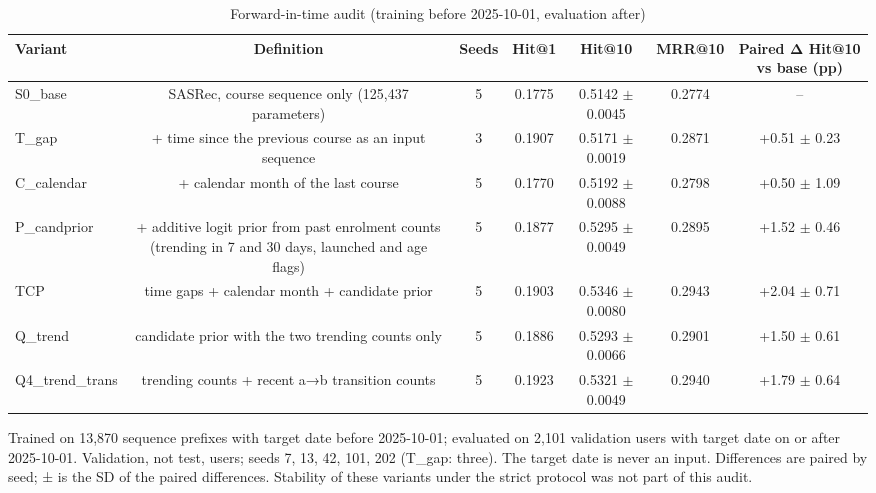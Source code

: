 \begin{table}[t]\centering\footnotesize
\caption{Forward-in-time audit (training before 2025-10-01, evaluation after)}
\begin{tabular}{lcccccc}\toprule
Variant & Definition & Seeds & Hit@1 & Hit@10 & MRR@10 & Paired Δ Hit@10 vs base (pp) \\
\midrule
S0\_base & SASRec, course sequence only (125,437 parameters) & 5 & 0.1775 & 0.5142 $\pm$ 0.0045 & 0.2774 & – \\
T\_gap & + time since the previous course as an input sequence & 3 & 0.1907 & 0.5171 $\pm$ 0.0019 & 0.2871 & +0.51 $\pm$ 0.23 \\
C\_calendar & + calendar month of the last course & 5 & 0.1770 & 0.5192 $\pm$ 0.0088 & 0.2798 & +0.50 $\pm$ 1.09 \\
P\_candprior & + additive logit prior from past enrolment counts (trending in 7 and 30 days, launched and age flags) & 5 & 0.1877 & 0.5295 $\pm$ 0.0049 & 0.2895 & +1.52 $\pm$ 0.46 \\
TCP & time gaps + calendar month + candidate prior & 5 & 0.1903 & 0.5346 $\pm$ 0.0080 & 0.2943 & +2.04 $\pm$ 0.71 \\
Q\_trend & candidate prior with the two trending counts only & 5 & 0.1886 & 0.5293 $\pm$ 0.0066 & 0.2901 & +1.50 $\pm$ 0.61 \\
Q4\_trend\_trans & trending counts + recent a→b transition counts & 5 & 0.1923 & 0.5321 $\pm$ 0.0049 & 0.2940 & +1.79 $\pm$ 0.64 \\
\bottomrule
\end{tabular}
\par\smallskip\footnotesize Trained on 13,870 sequence prefixes with target date before 2025-10-01; evaluated on 2,101 validation users with target date on or after 2025-10-01. Validation, not test, users; seeds 7, 13, 42, 101, 202 (T\_gap: three). The target date is never an input. Differences are paired by seed; ± is the SD of the paired differences. Stability of these variants under the strict protocol was not part of this audit.
\end{table}